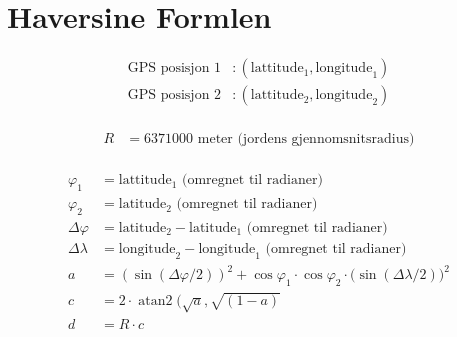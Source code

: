 \documentclass[]{article}
\DeclareMathOperator{\atantwo}{atan2}
\begin{document}
\section*{Haversine Formlen}

\begin{align*}
  \mbox{GPS posisjon 1} & : (\mbox{lattitude}_1,\mbox{longitude}_1) \\
  \mbox{GPS posisjon 2} & : (\mbox{lattitude}_2,\mbox{longitude}_2) \\
\end{align*}

\begin{align*}
R & = 6371000 \mbox{ meter (jordens gjennomsnitsradius)} \\
\end{align*}



\begin{align*}
  \varphi_1 & = \mbox{lattitude}_1 \mbox{ (omregnet til radianer)} \\
  \varphi_2 & = \mbox{latitude}_2 \mbox{ (omregnet til radianer)} \\
  \Delta \varphi & = \mbox{latitude}_2 - \mbox{latitude}_1 \mbox{ (omregnet til radianer)} \\
  \Delta \lambda &  = \mbox{longitude}_2 - \mbox{longitude}_1 \mbox{ (omregnet til radianer)} \\
  a & = (\sin{(\Delta \varphi / 2)})^2 + \cos{\varphi_1} \cdot \cos{\varphi_2} \cdot (\sin{(\Delta \lambda / 2))^2} \\
  c & = 2 \cdot \atantwo(\sqrt{a},\sqrt{(1-a)} \\
  d & = R \cdot c 
\end{align*}
\end{document}
